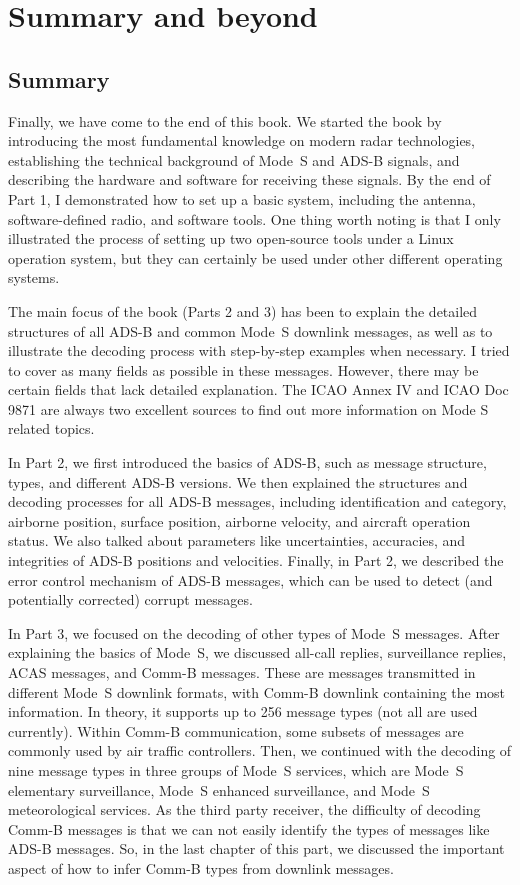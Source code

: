 \chapter{Summary and beyond}

\section{Summary}
Finally, we have come to the end of this book. We started the book by introducing the most fundamental knowledge on modern radar technologies, establishing the technical background of Mode~S and ADS-B signals, and describing the hardware and software for receiving these signals. By the end of Part 1, I demonstrated how to set up a basic system, including the antenna, software-defined radio, and software tools. One thing worth noting is that I only illustrated the process of setting up two open-source tools under a Linux operation system, but they can certainly be used under other different operating systems.

The main focus of the book (Parts 2 and 3) has been to explain the detailed structures of all ADS-B and common Mode~S downlink messages, as well as to illustrate the decoding process with step-by-step examples when necessary. I tried to cover as many fields as possible in these messages. However, there may be certain fields that lack detailed explanation. The ICAO Annex IV and ICAO Doc 9871 are always two excellent sources to find out more information on Mode S related topics.

In Part 2, we first introduced the basics of ADS-B, such as message structure, types, and different ADS-B versions. We then explained the structures and decoding processes for all ADS-B messages, including identification and category, airborne position, surface position, airborne velocity, and aircraft operation status. We also talked about parameters like uncertainties, accuracies, and integrities of ADS-B positions and velocities. Finally, in Part 2, we described the error control mechanism of ADS-B messages, which can be used to detect (and potentially corrected) corrupt messages.

In Part 3, we focused on the decoding of other types of Mode~S messages. After explaining the basics of Mode~S, we discussed all-call replies, surveillance replies, ACAS messages, and Comm-B messages. These are messages transmitted in different Mode~S downlink formats, with Comm-B downlink containing the most information. In theory, it supports up to 256 message types (not all are used currently). Within Comm-B communication, some subsets of messages are commonly used by air traffic controllers. Then, we continued with the decoding of nine message types in three groups of Mode~S services, which are Mode~S elementary surveillance, Mode~S enhanced surveillance, and Mode~S meteorological services. As the third party receiver, the difficulty of decoding Comm-B messages is that we can not easily identify the types of messages like ADS-B messages. So, in the last chapter of this part, we discussed the important aspect of how to infer Comm-B types from downlink messages.



